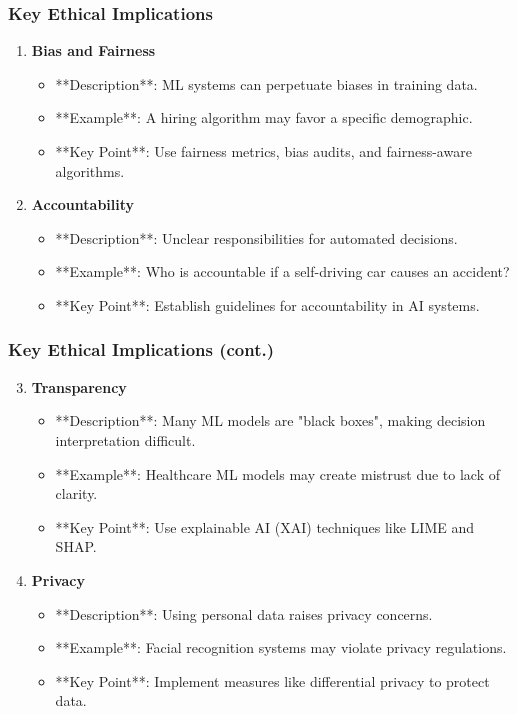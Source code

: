 \documentclass[aspectratio=169]{beamer}
\begin{document}
\begin{frame}[fragile]
    \frametitle{Key Ethical Implications}
    \begin{enumerate}
        \item \textbf{Bias and Fairness}
            \begin{itemize}
                \item **Description**: ML systems can perpetuate biases in training data.
                \item **Example**: A hiring algorithm may favor a specific demographic.
                \item **Key Point**: Use fairness metrics, bias audits, and fairness-aware algorithms.
            \end{itemize}
        
        \item \textbf{Accountability}
            \begin{itemize}
                \item **Description**: Unclear responsibilities for automated decisions.
                \item **Example**: Who is accountable if a self-driving car causes an accident?
                \item **Key Point**: Establish guidelines for accountability in AI systems.
            \end{itemize}
    \end{enumerate}
\end{frame}

\begin{frame}[fragile]
    \frametitle{Key Ethical Implications (cont.)}
    \begin{enumerate}
        \setcounter{enumi}{2} %
        \item \textbf{Transparency}
            \begin{itemize}
                \item **Description**: Many ML models are "black boxes", making decision interpretation difficult.
                \item **Example**: Healthcare ML models may create mistrust due to lack of clarity.
                \item **Key Point**: Use explainable AI (XAI) techniques like LIME and SHAP.
            \end{itemize}

        \item \textbf{Privacy}
            \begin{itemize}
                \item **Description**: Using personal data raises privacy concerns.
                \item **Example**: Facial recognition systems may violate privacy regulations.
                \item **Key Point**: Implement measures like differential privacy to protect data.
            \end{itemize}
    \end{enumerate}
\end{frame}
\end{document}
